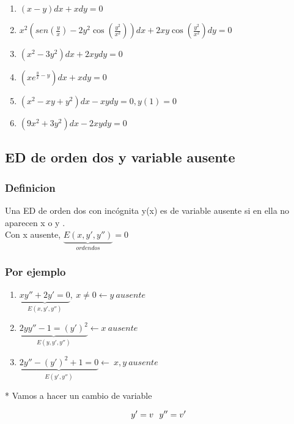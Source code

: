 \documentclass{article}
\begin{document}
\begin{enumerate}
\item $\left( x -y \right)dx  + xdy = 0 $
\item $x^2 \left( sen \left( \frac{y}{x} \right) -2y^2 \cos \left( \frac{y^2}{x^2} \right) \right) dx + 2xy \cos \left( \frac{y^2}{x^2} \right) dy = 0 $ 
\item $ \left(  x^2 -3y^2 \right) dx + 2 xy dy = 0 $
\item $ \left( xe^{\frac{y}{x} - y} \right)dx + xdy = 0 $
\item $ \left( x^2 -xy + y^2 \right) dx  - xy dy = 0,  y(1) = 0  $
\item $ \left( 9x^2 + 3y^2 \right)dx - 2xy dy = 0 $ 
\end{enumerate}

\subsection{ED de orden dos y variable ausente}

\subsubsection{Definicion}

Una ED de orden dos con incógnita y(x) es de variable ausente si en ella no aparecen x o y . \\

Con  x ausente,  $\underbrace{E \left( x,y',y'' \right)}_{orden dos} = 0 $

\subsubsection{ Por ejemplo}

\begin{enumerate}
\item $ \underbrace{xy'' + 2y' = 0}_{E \left( x, y' ,y'' \right) },  \ x \neq 0 \leftarrow y \  ausente $ 
\item $ \underbrace{2yy'' - 1 = (y')^2}_{E \left( y, y', y'' \right) } \leftarrow x \ ausente $
\item $ \underbrace{2y'' - (y')^2 +1 = 0}_{E \left( y' , y'' \right)} \leftarrow \ x,y \ ausente$
\end{enumerate}



* Vamos a hacer un cambio de variable 

\begin{equation}
\centering
\nonumber y' = v \ \  y'' =v'
\end{equation}
\end{document}
